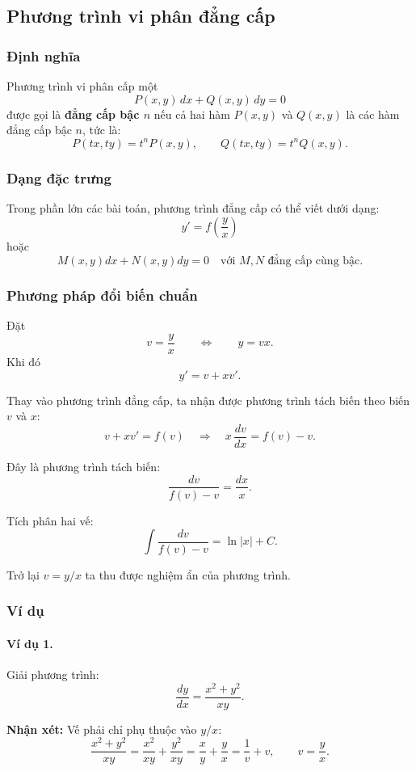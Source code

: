 \documentclass[12pt,a4paper]{article}
\begin{document}
\subsection{Phương trình vi phân đẳng cấp}

\subsubsection*{Định nghĩa}
Phương trình vi phân cấp một
\[
P(x,y)\,dx + Q(x,y)\,dy = 0
\]
được gọi là \textbf{đẳng cấp bậc $n$} nếu cả hai hàm $P(x,y)$ và $Q(x,y)$ là các hàm đẳng cấp bậc $n$, tức là:
\[
P(tx,ty) = t^{n} P(x,y), \qquad 
Q(tx,ty) = t^{n} Q(x,y).
\]

\subsubsection*{Dạng đặc trưng}
Trong phần lớn các bài toán, phương trình đẳng cấp có thể viết dưới dạng:
\[
y' = f\!\left(\frac{y}{x}\right)
\]
hoặc
\[
M(x,y)dx + N(x,y)dy = 0 \quad \text{với $M,N$ đẳng cấp cùng bậc}.
\]

\subsubsection*{Phương pháp đổi biến chuẩn}
Đặt
\[
v = \frac{y}{x} \qquad\Leftrightarrow\qquad y = vx.
\]
Khi đó
\[
y' = v + x v'.
\]

Thay vào phương trình đẳng cấp, ta nhận được phương trình tách biến theo biến $v$ và $x$:
\[
v + xv' = f(v)
\quad\Longrightarrow\quad
x\,\frac{dv}{dx} = f(v) - v.
\]

Đây là phương trình tách biến:
\[
\frac{dv}{f(v)-v} = \frac{dx}{x}.
\]

Tích phân hai vế:
\[
\int \frac{dv}{f(v)-v} = \ln|x| + C.
\]

Trở lại $v = y/x$ ta thu được nghiệm ẩn của phương trình.

\subsubsection*{Ví dụ}

\paragraph{Ví dụ 1.}
Giải phương trình:
\[
\frac{dy}{dx} = \frac{x^2 + y^2}{xy}.
\]

\textbf{Nhận xét:} Vế phải chỉ phụ thuộc vào $y/x$:
\[
\frac{x^2 + y^2}{xy}
= \frac{x^2}{xy} + \frac{y^2}{xy}
= \frac{x}{y} + \frac{y}{x}
= \frac{1}{v} + v,\qquad v=\frac{y}{x}.
\]
\end{document}
